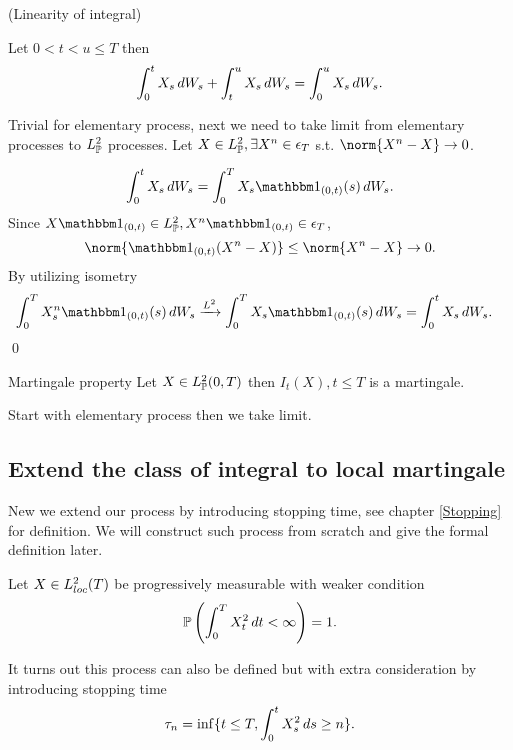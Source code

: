 \begin{lem}{(Linearity of \ito integral)}

Let $0< t < u \leq T$ then
\begin{equation*}
    \int_0^t X_s \mathop{}\!d W_s +\int_t^u X_s \mathop{}\!d W_s = \int_0^u X_s \mathop{}\!d W_s.
\end{equation*}
\end{lem}
\pf Trivial for elementary process, next we need to take limit from elementary processes to $L_{\mathbb{P}}^{2}$ processes. Let $X \in L_{\mathbb{P}}^{2}, \exists X^n \in \epsilon_T$ s.t. $\norm{X^n - X} \rightarrow 0$.

\begin{equation*}
    \int_0^t X_s \diff W_s = \int_0^T X_s \I{(0,t)}(s) \diff W_s.
\end{equation*}
Since $X \I{(0,t)}\in \lp{2}, X^n\I{(0,t)} \in \epsilon_T$,
\begin{equation*}
    \norm{\I{(0,t)}(X^n-X)} \leq \norm{X^n-X} \rightarrow 0.
\end{equation*}
By utilizing \ito isometry
\begin{align*}
    &\int_0^T X_s^n \I{(0,t)}(s) \diff W_s \xrightarrow{\ls{2}} \int_0^T X_s \I{(0,t)}(s) \diff W_s=\int_0^t X_s \diff W_s.
\end{align*}
\qed

\begin{lem}{Martingale property}
Let $X\in L_{\mathbb{P}}^{2}(0,T)$ then $I_t(X), t\leq T$ is a martingale.
\end{lem}

\pf Start with elementary process then we take limit. 

\subsection{Extend the class of \ito integral to local martingale}

New we extend our process by introducing stopping time, see chapter \ref{Stopping} for definition. We will construct such process from scratch and give the formal definition later.

\begin{dfn}
Let $X\in L_{loc}^2(T)$ be progressively measurable with weaker condition 
\begin{equation*}
    \mathbb{P}\left(\int_0^T X_t^2 \mathop{}\!d t < \infty\right) = 1.
\end{equation*}
\end{dfn}

It turns out this process can also be defined but with extra consideration by introducing stopping time
\begin{equation*}
    \tau_n = \inf \{t\leq T, \int_0^t X_s^2 \mathop{}\!d s \geq n\}.
\end{equation*}

